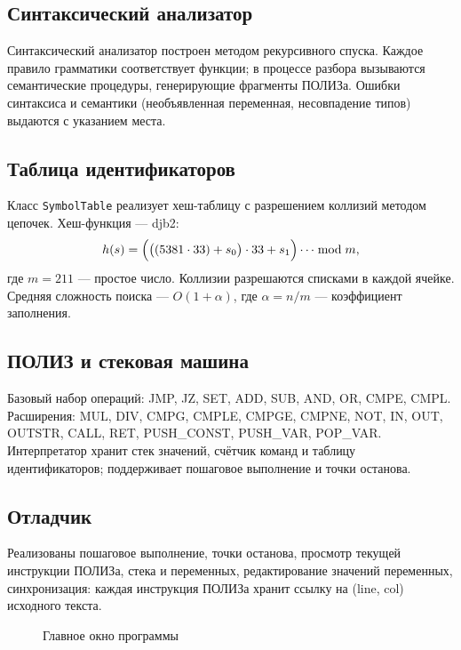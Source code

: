 \documentclass[14pt,a4paper]{article}
\begin{document}
\subsection{Синтаксический анализатор}

Синтаксический анализатор построен методом рекурсивного спуска.
Каждое правило грамматики соответствует функции; в процессе разбора
вызываются семантические процедуры, генерирующие фрагменты ПОЛИЗа.
Ошибки синтаксиса и семантики (необъявленная переменная,
несовпадение типов) выдаются с указанием места.

\subsection{Таблица идентификаторов}

Класс \texttt{SymbolTable} реализует хеш-таблицу с разрешением
коллизий методом цепочек. Хеш-функция — djb2:
\begin{equation}
h(s) = \Bigl(\bigl((5381 \cdot 33) + s_0\bigr)\cdot 33 + s_1\Bigr)\cdots \bmod m,
\end{equation}
где $m = 211$ — простое число. Коллизии разрешаются списками
в каждой ячейке. Средняя сложность поиска — $O(1+\alpha)$, где
$\alpha = n/m$ — коэффициент заполнения.

\subsection{ПОЛИЗ и стековая машина}

Базовый набор операций: JMP, JZ, SET, ADD, SUB, AND, OR, CMPE, CMPL.
Расширения: MUL, DIV, CMPG, CMPLE, CMPGE, CMPNE, NOT, IN, OUT, OUTSTR,
CALL, RET, PUSH\_CONST, PUSH\_VAR, POP\_VAR. Интерпретатор хранит стек
значений, счётчик команд и таблицу идентификаторов; поддерживает
пошаговое выполнение и точки останова.

\subsection{Отладчик}

Реализованы пошаговое выполнение, точки останова, просмотр текущей
инструкции ПОЛИЗа, стека и переменных, редактирование значений
переменных, синхронизация: каждая инструкция ПОЛИЗа хранит ссылку
на (line, col) исходного текста.

\begin{figure}[H]
  \centering
  \caption{Главное окно программы}
  \label{fig:gui}
\end{figure}
\end{document}
